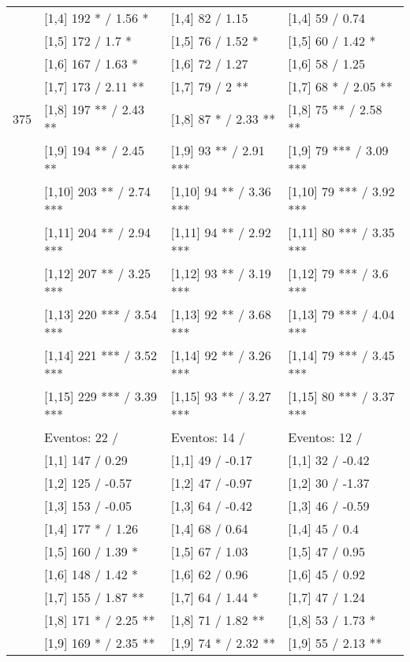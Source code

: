 \begin{table}
\begin{tabular}[t]{llll}
\addlinespace
 & {}[1,4] 192 * / 1.56 * & {}[1,4] 82  / 1.15 & {}[1,4] 59  / 0.74\\
 & {}[1,5] 172  / 1.7 * & {}[1,5] 76  / 1.52 * & {}[1,5] 60  / 1.42 *\\
 & {}[1,6] 167  / 1.63 * & {}[1,6] 72  / 1.27 & {}[1,6] 58  / 1.25\\
 & {}[1,7] 173  / 2.11 ** & {}[1,7] 79  / 2 ** & {}[1,7] 68 * / 2.05 **\\
375 & {}[1,8] 197 ** / 2.43 ** & {}[1,8] 87 * / 2.33 ** & {}[1,8] 75 ** / 2.58 **\\
\addlinespace
 & {}[1,9] 194 ** / 2.45 ** & {}[1,9] 93 ** / 2.91 *** & {}[1,9] 79 *** / 3.09 ***\\
 & {}[1,10] 203 ** / 2.74 *** & {}[1,10] 94 ** / 3.36 *** & {}[1,10] 79 *** / 3.92 ***\\
 & {}[1,11] 204 ** / 2.94 *** & {}[1,11] 94 ** / 2.92 *** & {}[1,11] 80 *** / 3.35 ***\\
 & {}[1,12] 207 ** / 3.25 *** & {}[1,12] 93 ** / 3.19 *** & {}[1,12] 79 *** / 3.6 ***\\
 & {}[1,13] 220 *** / 3.54 *** & {}[1,13] 92 ** / 3.68 *** & {}[1,13] 79 *** / 4.04 ***\\
\addlinespace
 & {}[1,14] 221 *** / 3.52 *** & {}[1,14] 92 ** / 3.26 *** & {}[1,14] 79 *** / 3.45 ***\\
 & {}[1,15] 229 *** / 3.39 *** & {}[1,15] 93 ** / 3.27 *** & {}[1,15] 80 *** / 3.37 ***\\
 & Eventos:  22 / & Eventos:  14 / & Eventos:  12 /\\
 & {}[1,1] 147  / 0.29 & {}[1,1] 49  / -0.17 & {}[1,1] 32  / -0.42\\
 & {}[1,2] 125  / -0.57 & {}[1,2] 47  / -0.97 & {}[1,2] 30  / -1.37\\
\addlinespace
 & {}[1,3] 153  / -0.05 & {}[1,3] 64  / -0.42 & {}[1,3] 46  / -0.59\\
 & {}[1,4] 177 * / 1.26 & {}[1,4] 68  / 0.64 & {}[1,4] 45  / 0.4\\
 & {}[1,5] 160  / 1.39 * & {}[1,5] 67  / 1.03 & {}[1,5] 47  / 0.95\\
 & {}[1,6] 148  / 1.42 * & {}[1,6] 62  / 0.96 & {}[1,6] 45  / 0.92\\
 & {}[1,7] 155  / 1.87 ** & {}[1,7] 64  / 1.44 * & {}[1,7] 47  / 1.24\\
\addlinespace
500 & {}[1,8] 171 * / 2.25 ** & {}[1,8] 71  / 1.82 ** & {}[1,8] 53  / 1.73 *\\
 & {}[1,9] 169 * / 2.35 ** & {}[1,9] 74 * / 2.32 ** & {}[1,9] 55  / 2.13 **\\

\end{tabular}
\end{table}
